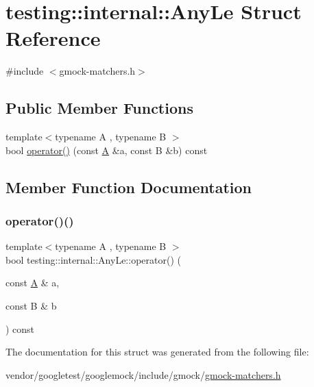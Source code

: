 \hypertarget{structtesting_1_1internal_1_1_any_le}{}\section{testing\+:\+:internal\+:\+:Any\+Le Struct Reference}
\label{structtesting_1_1internal_1_1_any_le}


{\ttfamily \#include $<$gmock-\/matchers.\+h$>$}

\subsection*{Public Member Functions}
\begin{DoxyCompactItemize}
\item 
{\footnotesize template$<$typename A , typename B $>$ }\\bool \hyperlink{structtesting_1_1internal_1_1_any_le_aadb369f2ea23ba9889b06df4c8bc1b82}{operator()} (const \hyperlink{namespacetesting_a5e9134d655d2fc9323902348083282e7}{A} \&a, const B \&b) const
\end{DoxyCompactItemize}


\subsection{Member Function Documentation}
\mbox{\label{structtesting_1_1internal_1_1_any_le_aadb369f2ea23ba9889b06df4c8bc1b82}} 
\subsubsection{\texorpdfstring{operator()()}{operator()()}}
{\footnotesize\ttfamily template$<$typename A , typename B $>$ \\
bool testing\+::internal\+::\+Any\+Le\+::operator() (\begin{DoxyParamCaption}\item[{const \hyperlink{namespacetesting_a5e9134d655d2fc9323902348083282e7}{A} \&}]{a,  }\item[{const B \&}]{b }\end{DoxyParamCaption}) const\hspace{0.3cm}{\ttfamily [inline]}}



The documentation for this struct was generated from the following file\+:\begin{DoxyCompactItemize}
\item 
vendor/googletest/googlemock/include/gmock/\hyperlink{gmock-matchers_8h}{gmock-\/matchers.\+h}\end{DoxyCompactItemize}
